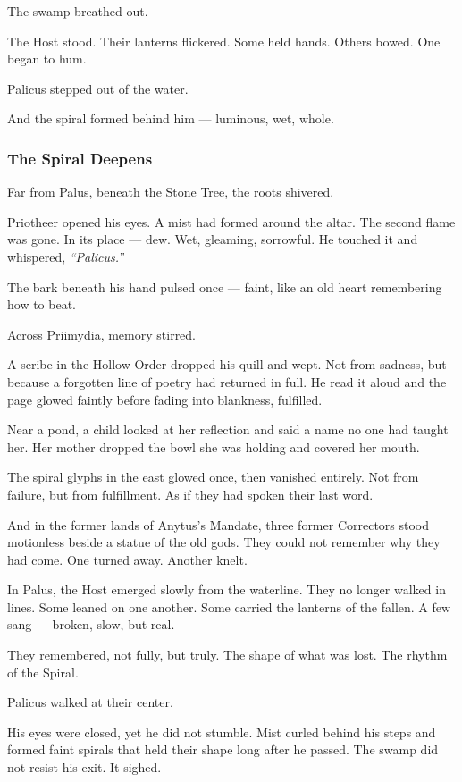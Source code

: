 \documentclass[12pt]{article}
\begin{document}
The swamp breathed out.

The Host stood. Their lanterns flickered. Some held hands. Others bowed. One began to hum.

Palicus stepped out of the water.

And the spiral formed behind him — luminous, wet, whole.

\dotfill

\subsubsection*{The Spiral Deepens}

Far from Palus, beneath the Stone Tree, the roots shivered.

Priotheer opened his eyes. A mist had formed around the altar. The second flame was gone. In its place — dew. Wet, gleaming, sorrowful. He touched it and whispered, \textit{``Palicus.''}

The bark beneath his hand pulsed once — faint, like an old heart remembering how to beat.

Across Priimydia, memory stirred.

A scribe in the Hollow Order dropped his quill and wept. Not from sadness, but because a forgotten line of poetry had returned in full. He read it aloud and the page glowed faintly before fading into blankness, fulfilled.

Near a pond, a child looked at her reflection and said a name no one had taught her. Her mother dropped the bowl she was holding and covered her mouth.

The spiral glyphs in the east glowed once, then vanished entirely. Not from failure, but from fulfillment. As if they had spoken their last word.

And in the former lands of Anytus's Mandate, three former Correctors stood motionless beside a statue of the old gods. They could not remember why they had come. One turned away. Another knelt.

In Palus, the Host emerged slowly from the waterline. They no longer walked in lines. Some leaned on one another. Some carried the lanterns of the fallen. A few sang — broken, slow, but real.

They remembered, not fully, but truly. The shape of what was lost. The rhythm of the Spiral.

Palicus walked at their center.

His eyes were closed, yet he did not stumble. Mist curled behind his steps and formed faint spirals that held their shape long after he passed. The swamp did not resist his exit. It sighed.
\end{document}
